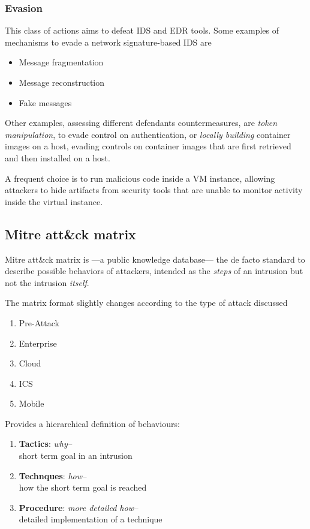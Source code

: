 \subsubsection{Evasion}
This class of actions aims to defeat IDS and EDR tools.
Some examples of mechanisms to evade a network signature-based IDS are
\begin{itemize}
   \item Message fragmentation
   \item Message reconstruction
   \item Fake messages
\end{itemize}

Other examples, assessing different defendants countermeasures, are
\textit{token manipulation}, to evade control on authentication, or 
\textit{locally building} container images on a host, evading controls on container images that are first retrieved and then installed on a host.

A frequent choice is to run malicious code inside a VM 
instance, allowing attackers to hide artifacts from security tools that are unable to
monitor activity inside the virtual instance.


\subsection{Mitre att\&ck matrix}

Mitre att\&ck matrix is {---}a public knowledge database{---} the de facto standard to describe possible behaviors of attackers,
intended as
the \textit{steps} of an intrusion but not the intrusion \textit{itself}.

The matrix format slightly changes according to the type of attack discussed
\begin{enumerate}
   \item Pre-Attack
   \item Enterprise
   \item Cloud
   \item ICS
   \item Mobile
\end{enumerate}


Provides a hierarchical definition of behaviours:
\begin{enumerate}
   \item \textbf{Tactics}: \textit{\color{gray}{--}why{--}}\\
   short term goal in an intrusion 
   \item \textbf{Technques}:  \textit{\color{gray}{--}how{--}}\\
   how the short term goal is reached 
   \item \textbf{Procedure}:  \textit{\color{gray}{--}more detailed how{--}}\\
   detailed implementation of a technique 
\end{enumerate}



